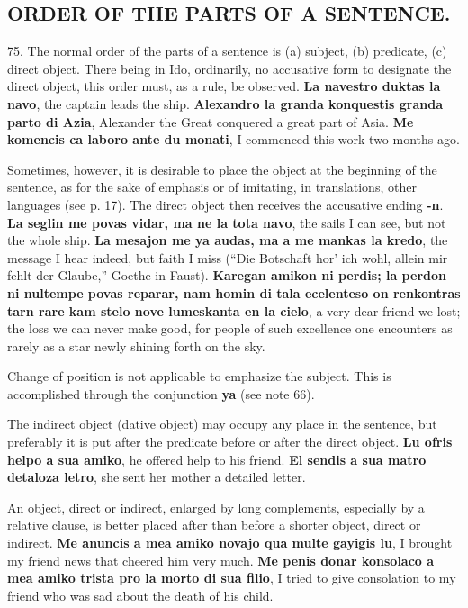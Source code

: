 \subsection*{ORDER OF THE PARTS OF A SENTENCE.}
75. The normal order of the parts of a sentence is (a) subject, (b) predicate, (c) direct object. There being in Ido, ordinarily, no accusative form to designate the direct object, this order must, as a rule, be observed. \textbf{La navestro duktas la navo}, the captain leads the ship. \textbf{Alexandro la granda konquestis granda parto di Azia}, Alexander the Great conquered a great part of Asia. \textbf{Me komencis ca laboro ante du monati}, I commenced this work two months ago. 

Sometimes, however, it is desirable to place the object at the beginning of the sentence, as for the sake of emphasis or of imitating, in translations, other languages (see p. 17). The direct object then receives the accusative ending \textbf{-n}. \textbf{La seglin me povas vidar, ma ne la tota navo}, the sails I can see, but not the whole ship. \textbf{La mesajon me ya audas, ma a me mankas la kredo}, the message I hear indeed, but faith I miss (``Die Botschaft hor' ich wohl, allein mir fehlt der Glaube,'' Goethe in Faust). \textbf{Karegan amikon ni perdis; la perdon ni nultempe povas reparar, nam homin di tala ecelenteso on renkontras tarn rare kam stelo nove lumeskanta en la cielo}, a very dear friend we lost; the loss we can never make good, for people of such excellence one encounters as rarely as a star newly shining forth on the sky. 

Change of position is not applicable to emphasize the subject. This is accomplished through the conjunction \textbf{ya} (see note 66). 

The indirect object (dative object) may occupy any place in the sentence, but preferably it is put after the predicate before or after the direct object. \textbf{Lu ofris helpo a sua amiko}, he offered help to his friend. \textbf{El sendis a sua matro detaloza letro}, she sent her mother a detailed letter. 

An object, direct or indirect, enlarged by long complements, especially by a relative clause, is better placed after than before a shorter object, direct or indirect. \textbf{Me anuncis a mea amiko novajo qua multe gayigis lu}, I brought my friend news that cheered him very much. \textbf{Me penis donar konsolaco a mea amiko trista pro la morto di sua filio}, I tried to give consolation to my friend who was sad about the death of his child. 

